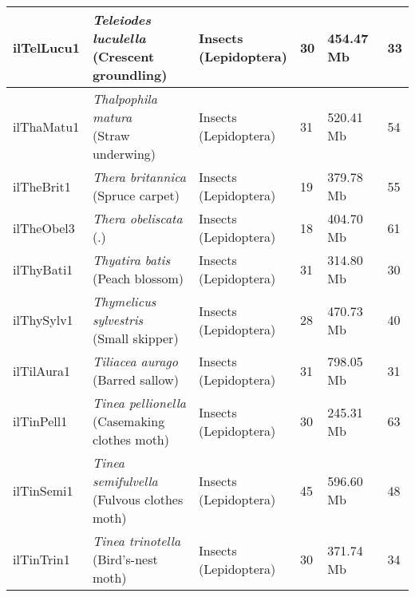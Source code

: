 \begin{centering}
\begin{longtable}{l|l|l|l|l|l}
ilTelLucu1 & \makecell[{l}]{\textit{Teleiodes luculella} \\ (Crescent groundling)} & \makecell[{l}]{Insects \\ (Lepidoptera)} & 30 & 454.47 Mb & 33  \\ \hline
ilThaMatu1 & \makecell[{l}]{\textit{Thalpophila matura} \\ (Straw underwing)} & \makecell[{l}]{Insects \\ (Lepidoptera)} & 31 & 520.41 Mb & 54  \\ \hline
ilTheBrit1 & \makecell[{l}]{\textit{Thera britannica} \\ (Spruce carpet)} & \makecell[{l}]{Insects \\ (Lepidoptera)} & 19 & 379.78 Mb & 55  \\ \hline
ilTheObel3 & \makecell[{l}]{\textit{Thera obeliscata} \\ (.)} & \makecell[{l}]{Insects \\ (Lepidoptera)} & 18 & 404.70 Mb & 61  \\ \hline
ilThyBati1 & \makecell[{l}]{\textit{Thyatira batis} \\ (Peach blossom)} & \makecell[{l}]{Insects \\ (Lepidoptera)} & 31 & 314.80 Mb & 30  \\ \hline
ilThySylv1 & \makecell[{l}]{\textit{Thymelicus sylvestris} \\ (Small skipper)} & \makecell[{l}]{Insects \\ (Lepidoptera)} & 28 & 470.73 Mb & 40  \\ \hline
ilTilAura1 & \makecell[{l}]{\textit{Tiliacea aurago} \\ (Barred sallow)} & \makecell[{l}]{Insects \\ (Lepidoptera)} & 31 & 798.05 Mb & 31  \\ \hline
ilTinPell1 & \makecell[{l}]{\textit{Tinea pellionella} \\ (Casemaking clothes moth)} & \makecell[{l}]{Insects \\ (Lepidoptera)} & 30 & 245.31 Mb & 63  \\ \hline
ilTinSemi1 & \makecell[{l}]{\textit{Tinea semifulvella} \\ (Fulvous clothes moth)} & \makecell[{l}]{Insects \\ (Lepidoptera)} & 45 & 596.60 Mb & 48  \\ \hline
ilTinTrin1 & \makecell[{l}]{\textit{Tinea trinotella} \\ (Bird's-nest moth)} & \makecell[{l}]{Insects \\ (Lepidoptera)} & 30 & 371.74 Mb & 34  \\ \hline

\end{longtable}
\end{centering}
